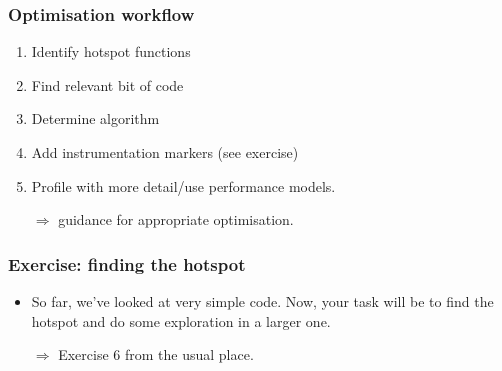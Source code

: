\documentclass[dvipsnames,presentation,aspectratio=169,14pt]{beamer}
\begin{document}
\begin{frame}
  \frametitle{Optimisation workflow}
  \begin{enumerate}[itemsep=6pt]
  \item Identify hotspot functions
  \item Find relevant bit of code
  \item Determine algorithm
  \item Add instrumentation markers (see exercise)
  \item Profile with more detail/use performance models.
  \item[$\Rightarrow$] guidance for appropriate optimisation.
  \end{enumerate}
\end{frame}

\begin{frame}
  \frametitle{Exercise: finding the hotspot}
  \begin{itemize}
  \item So far, we've looked at very simple code. Now, your task will
    be to find the hotspot and do some exploration in a larger one.
  \item[$\Rightarrow$] Exercise 6 from the usual place.
  \end{itemize}
\end{frame}
\end{document}
